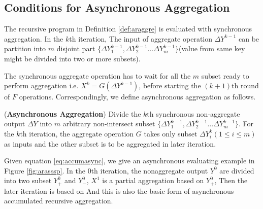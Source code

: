 {	\subsection{Conditions for Asynchronous Aggregation}
	\label{sec:async:condition}

	The recursive program in Definition \ref{def:araggre} is evaluated with synchronous aggregation. 
	In the $k$th iteration, The input of aggregate operation  $\Delta Y^{k-1}$ can be partition into $m$ disjoint part $\{\Delta Y_1^{k-1},\Delta Y_2^{k-1}\ldots \Delta Y_m^{k-1} \}$(value from same key might be divided into two or more subsets).
	
	The synchronous aggregate operation has to wait for all the $m$ subset ready to perform aggregation i.e. $X^k= G( \Delta Y^{k-1})$, before starting the $(k+1)$th round of $F$ operations.  Correspondingly, we define asynchronous aggregation as follows.
	\begin{definition}(\textbf{Asynchronous Aggregation})
		\label{def:asyncaggre}
		Divide the $k$th synchronous non-aggregate output $\Delta Y$ into $m$ arbitrary non-intersect subset $\{\Delta Y_1^{k-1},\Delta Y_2^{k-1}\ldots \Delta Y_m^{k-1} \}$. For the $k$th iteration, the aggregate operation $G$ takes only subset $\Delta Y_{i}^k(1\le i\le m)$ as inputs and the other subset is to be aggregated in later iteration.
	\end{definition}
	
	Given equation \ref{eq:accumasync}, we give an asynchronous evaluating example in Figure \ref{fig:arasssp}. In the $0$th iteration, the nonaggregate output $Y^0$ are divided into two subset $Y^0_+$ and $Y^0_-$, $X^1$ is a partial aggregation based on $Y^0_+$, Then the later iteration is based on 
	And this is also the basic form of asynchronous accumulated recursive aggregation. 
	
}

